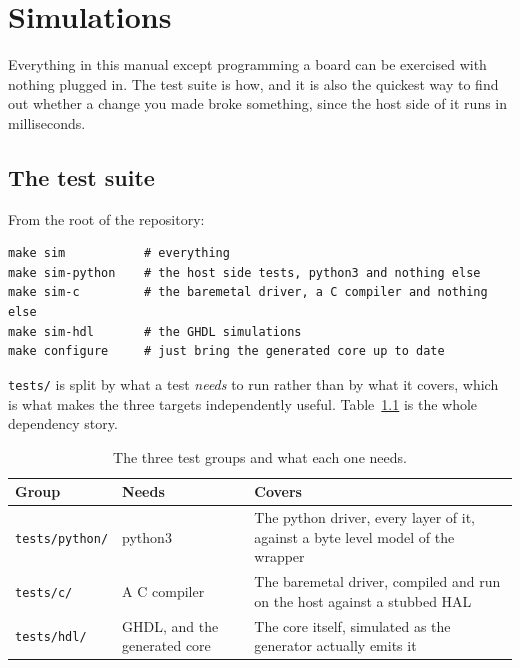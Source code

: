 \documentclass[../manual.tex]{subfiles}
\begin{document}
\chapter{Simulations}
\label{app:nohw}

Everything in this manual except programming a board can be exercised with nothing plugged in. The test suite is how, and it is also the quickest way to find out whether a change you made broke something, since the host side of it runs in milliseconds.

\section{The test suite}
\label{sec:nohw_tests}

From the root of the repository:

\begin{lstlisting}
make sim           # everything
make sim-python    # the host side tests, python3 and nothing else
make sim-c         # the baremetal driver, a C compiler and nothing else
make sim-hdl       # the GHDL simulations
make configure     # just bring the generated core up to date
\end{lstlisting}

\texttt{tests/} is split by what a test \emph{needs} to run rather than by what it covers, which is what makes the three targets independently useful. Table~\ref{tab:nohw_groups} is the whole dependency story.

\begin{table}[H]
    \centering
    \begin{tabularx}{\textwidth}{|l|l|X|}
        \hline
        \rowcolor{gray!40} \textbf{Group} & \textbf{Needs} & \textbf{Covers} \\
        \hline
        \texttt{tests/python/} & python3 & The python driver, every layer of it, against a byte level model of the wrapper \\
        \hline
        \texttt{tests/c/} & A C compiler & The baremetal driver, compiled and run on the host against a stubbed HAL \\
        \hline
        \texttt{tests/hdl/} & GHDL, and the generated core & The core itself, simulated as the generator actually emits it \\
        \hline
    \end{tabularx}
    \caption{The three test groups and what each one needs.}
    \label{tab:nohw_groups}
\end{table}
\end{document}
